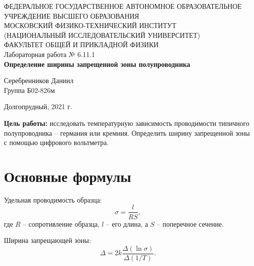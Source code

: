 \documentclass[a4paper,12pt]{article} %
\begin{document}
	\begin{center}
		\footnotesize{ФЕДЕРАЛЬНОЕ ГОСУДАРСТВЕННОЕ АВТОНОМНОЕ ОБРАЗОВАТЕЛЬНОЕ 			УЧРЕЖДЕНИЕ ВЫСШЕГО ОБРАЗОВАНИЯ}\\
		\footnotesize{МОСКОВСКИЙ ФИЗИКО-ТЕХНИЧЕСКИЙ ИНСТИТУТ\\(НАЦИОНАЛЬНЫЙ 			ИССЛЕДОВАТЕЛЬСКИЙ УНИВЕРСИТЕТ)}\\
		\footnotesize{ФАКУЛЬТЕТ ОБЩЕЙ И ПРИКЛАДНОЙ ФИЗИКИ\\}
		\hfill \break
		\hfill\break
		\hfill\break
		\hfill \break
		\hfill \break
		\hfill \break
		\hfill \break
		\hfill \break
		\hfill \break
		\hfill \break
		\hfill \break
		\hfill \break
		\hfill \break
		\hfill \break
		\large{Лабораторная работа № 6.11.1 \\\textbf{Определение ширины запрещенной зоны полупроводника}}\\
		\hfill \break
		\hfill \break
		\hfill \break
		\begin{flushright}
			Серебренников Даниил\\
			Группа Б02-826м
		\end{flushright}
		\hfill \break
		\hfill \break
		\hfill \break
		\hfill \break
		\hfill \break
		\hfill \break
		\hfill \break
		\hfill \break
		\hfill \break
		\hfill \break
		\hfill \break
	\end{center}
	\begin{center}
		Долгопрудный, 2021 г.
	\end{center}
	\thispagestyle{empty}
	\newpage
	\textbf{Цель работы:} исследовать температурную зависимость проводимости типичного полупроводника -- германия или кремния. Определить ширину запрещенной зоны с помощью цифрового вольтметра.
	
	\section{Основные формулы}
	Удельная проводимость образца:
	\begin{equation*}
		\sigma = \frac{l}{RS},
	\end{equation*}
	где $R$ -- сопротивление образца, $l$ -- его длина, а $S$ -- поперечное сечение.
	
	Ширина запрещающей зоны:
	\begin{equation*}
		\label{delta}
		\tag{$\star$}
		\Delta = 2k \frac{\Delta(\ln \sigma)}{\Delta (1/T)}.
	\end{equation*}
\end{document}

